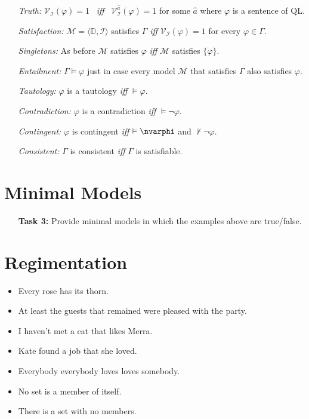 \documentclass[a4paper, 11pt]{article} %
\newcommand{\tuple}[1]{\langle#1\rangle} %
\newcommand{\set}[1]{\lbrace#1\rbrace} %
\newcommand{\I}{\mathcal{I}}
\newcommand{\M}{\mathcal{M}}
\newcommand{\D}{\mathbb{D}}
\newcommand{\VV}[2]{\mathcal{V}_{#1}^{#2}} %
\begin{document}
\begin{enumerate}
  \item[\it Truth:] $\VV{\I}{}(\varphi)=1$ ~\textit{iff}~ $\VV{\I}{\hat{a}}(\varphi)=1$ for some $\hat{a}$ where $\varphi$ is a sentence of QL. 
  \item[\it Satisfaction:] $\M=\tuple{\D,\I}$ satisfies $\Gamma$ \textit{iff} $\VV{\I}{}(\varphi)=1$ for every $\varphi\in\Gamma$.
  \item[\it Singletons:] As before $\M$ satisfies $\varphi$ \textit{iff} $\M$ satisfies $\set{\varphi}$.
  \item[\it Entailment:] $\Gamma\vDash\varphi$ just in case every model $\M$ that satisfies $\Gamma$ also satisfies $\varphi$.
  \item[\it Tautology:] $\varphi$ is a tautology \textit{iff} $\vDash \varphi$.
  \item[\it Contradiction:] $\varphi$ is a contradiction \textit{iff} $\vDash \neg\varphi$.
  \item[\it Contingent:] $\varphi$ is contingent \textit{iff} $\vDash \nvarphi$ and $\nvdash \neg\varphi$. 
  \item[\it Consistent:] $\Gamma$ is consistent \textit{iff} $\Gamma$ is satisfiable. 
\end{enumerate}



\section*{Minimal Models}

\begin{enumerate}
  \item[\bf Task 3:] Provide minimal models in which the examples above are true/false.
\end{enumerate}


\section*{Regimentation}

  \begin{itemize}
    \item Every rose has its thorn.
    \item At least the guests that remained were pleased with the party.
    \item I haven't met a cat that likes Merra.
    \item Kate found a job that she loved.
    \item Everybody everybody loves loves somebody.
    \item No set is a member of itself.
    \item There is a set with no members.
  \end{itemize}
\end{document}
